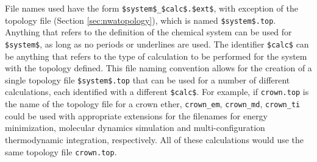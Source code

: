 File names used have the form \verb+$system$_$calc$.$ext$+, with
exception of the topology file (Section \ref{sec:nwatopology}), which is named 
\verb+$system$.top+.
Anything that refers to the definition of the chemical system can be used
for \verb+$system$+, as long as no periods or underlines are used.
The identifier \verb+$calc$+ can be anything that refers to the type of 
calculation to be performed for the system with the topology defined.
This file naming convention allows for the creation of a single
topology file \verb+$system$.top+ that can be used for a number of 
different calculations, each identified with a different \verb+$calc$+.
For example, if {\tt crown.top} is the name of the topology file for
a crown ether, {\tt crown\_em}, {\tt crown\_md}, {\tt crown\_ti} could
be used with appropriate extensions for the filenames for energy
minimization, molecular dynamics simulation and multi-configuration
thermodynamic integration, respectively. All of these calculations
would use the same topology file {\tt crown.top}.

\label{sec:nwaextensions}


